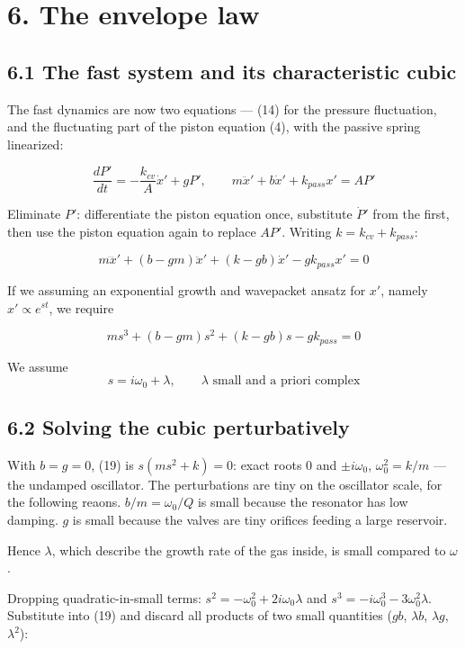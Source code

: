 \documentclass[11pt]{article}
\begin{document}
\section*{6. The envelope law}

\subsection*{6.1 The fast system and its characteristic cubic}

The fast dynamics are now two equations --- (14) for the pressure fluctuation, and the fluctuating part of the piston equation (4), with the passive spring linearized:

\begin{equation}
\frac{dP'}{dt} = -\frac{k_{cv}}{A}\dot x' + gP', \qquad m\ddot x' + b\dot x' + k_{pass}x' = AP' \tag{18}
\end{equation}

Eliminate $P'$: differentiate the piston equation once, substitute $\dot P'$ from the first, then use the piston equation again to replace $AP'$. Writing $k = k_{cv}+k_{pass}$:

\[
m\dddot x' + (b - gm)\ddot x' + (k - gb)\dot x' - gk_{pass}x' = 0
\]

If we assuming an exponential growth and wavepacket ansatz for $x'$, namely $x' \propto e^{st}$, we require

\begin{equation}
ms^3 + (b - gm)s^2 + (k - gb)s - gk_{pass} = 0 \tag{19}
\end{equation}

We assume
\[
s = i\omega_0 + \lambda, \qquad \lambda \text{ small and a priori complex}
\]

\subsection*{6.2 Solving the cubic perturbatively}

With $b = g = 0$, (19) is $s(ms^2 + k) = 0$: exact roots $0$ and $\pm i\omega_0$, $\omega_0^2 = k/m$ --- the undamped oscillator. The perturbations are tiny on the oscillator scale, for the following reaons. $b/m = \omega_0/Q$ is small because the resonator has low damping. $g$ is small because the valves are tiny orifices feeding a large reservoir.

Hence $\lambda$, which describe the growth rate of the gas inside, is small compared to $\omega$.

Dropping quadratic-in-small terms: $s^2 = -\omega_0^2 + 2i\omega_0\lambda$ and $s^3 = -i\omega_0^3 - 3\omega_0^2\lambda$. Substitute into (19) and discard all products of two small quantities ($gb$, $\lambda b$, $\lambda g$, $\lambda^2$):
\end{document}
